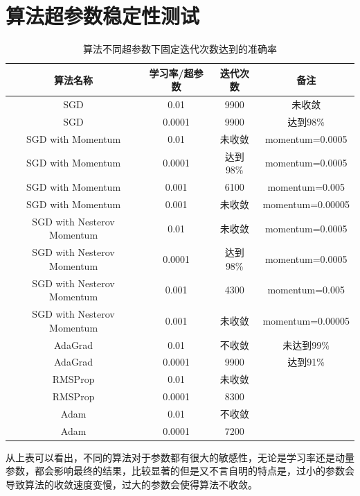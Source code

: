 \documentclass[a4paper, UTF8]{ctexrep}
\begin{document}
		\section{算法超参数稳定性测试}
			\begin{table}[htbp!]
				\centering
				\begin{tabular}{cccc}
					\hline
					算法名称 & 学习率/超参数 & 迭代次数 & 备注 \\
					\hline
					SGD & 0.01 & 9900 & 未收敛  \\
					SGD & 0.0001 & 9900 & 达到98\% \\
					SGD with Momentum & 0.01 & 未收敛 & momentum=0.0005 \\
					SGD with Momentum & 0.0001 & 达到98\% & momentum=0.0005 \\
					SGD with Momentum & 0.001 & 6100 & momentum=0.005 \\
					SGD with Momentum & 0.001 & 未收敛 & momentum=0.00005 \\
					SGD with Nesterov Momentum & 0.01 & 未收敛 & momentum=0.0005 \\
					SGD with Nesterov Momentum & 0.0001 & 达到98\% & momentum=0.0005 \\
					SGD with Nesterov Momentum & 0.001 & 4300 & momentum=0.005 \\
					SGD with Nesterov Momentum & 0.001 & 未收敛 & momentum=0.00005 \\
					AdaGrad & 0.01 & 不收敛 & 未达到99\% \\
					AdaGrad & 0.0001 & 9900 & 达到91\% \\
					RMSProp & 0.01 & 未收敛 &   \\
					RMSProp & 0.0001 & 8300 &   \\
					Adam & 0.01 & 不收敛 &   \\
					Adam & 0.0001 & 7200 &   \\
					\hline
				\end{tabular}
				\caption{算法不同超参数下固定迭代次数达到的准确率}
			\end{table}
			从上表可以看出，不同的算法对于参数都有很大的敏感性，无论是学习率还是动量参数，都会影响最终的结果，比较显著的但是又不言自明的特点是，过小的参数会导致算法的收敛速度变慢，过大的参数会使得算法不收敛。
			\clearpage
\end{document}
